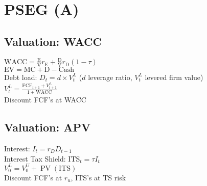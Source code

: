 \section{PSEG (A)}
	\subsection*{Valuation: WACC}
	$\text{WACC} = \frac{\text{E}}{\text{V}}r_{\text{E}} + \frac{\text{D}}{\text{V}}r_{\text{D}}\left(1 - \tau\right)$\\
	$\text{EV} = \text{MC} + \text{D} - \text{Cash}$\\
	Debt load: $D_{t} = d\times V_{t}^{L}$ ($d$ leverage ratio, $V_{t}^{L}$ levered firm value)\\
	$V_{t}^{L} = \frac{\text{FCF}_{t+1} + V_{t+1}^{L}}{1 + \text{WACC}}$\\
	Discount FCF's at WACC
	
	\subsection*{Valuation: APV}
	Interest: $I_{t} = r_{D}D_{t - 1}$\\
	Interest Tax Shield: $\text{ITS}_{t} = \tau I_{t}$\\
	$V_{0}^{L} = V_{0}^{U} + \operatorname{PV}\left(\text{ITS}\right)$\\
	Discount FCF's at $r_{u}$, ITS's at TS risk
	